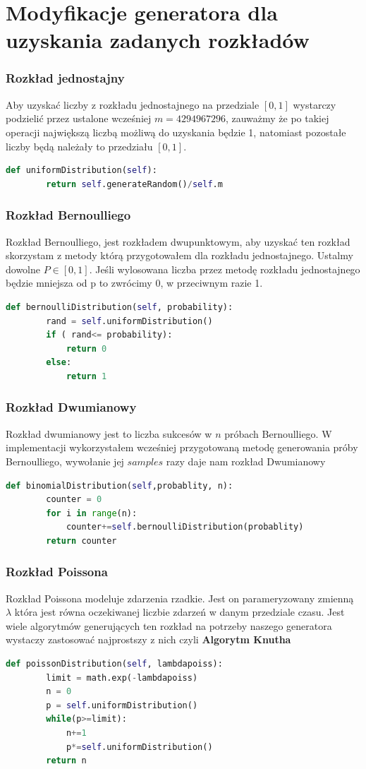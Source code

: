\documentclass[9pt]{beamer}
\begin{document}
\section{Modyfikacje generatora dla uzyskania zadanych rozkładów}
\begin{frame}[containsverbatim]
  \frametitle{Rozkład jednostajny}
  Aby uzyskać liczby z rozkładu jednostajnego na przedziale $[0,1]$ wystarczy podzielić przez ustalone wcześniej $m=4294967296$, zauważmy że po takiej operacji największą liczbą możliwą do uzyskania będzie 1, natomiast pozostałe liczby będą należały to przedziału $[0,1]$.
  \begin{lstlisting}[language=Python, caption=Metoda rozkładu jednostajnego]
    def uniformDistribution(self):
        return self.generateRandom()/self.m
    \end{lstlisting}
\end{frame}
\begin{frame}[containsverbatim]
  
  \frametitle{Rozkład Bernoulliego}
  Rozkład Bernoulliego, jest rozkładem dwupunktowym, aby uzyskać ten rozkład skorzystam z metody którą przygotowałem dla rozkładu jednostajnego. Ustalmy dowolne $P\in [0,1]$. Jeśli wylosowana liczba przez metodę rozkładu jednostajnego będzie mniejsza od p to zwrócimy 0, w przeciwnym razie 1.
  \begin{lstlisting}[language=Python, caption=Metoda rozkładu Bernoulliego]
    def bernoulliDistribution(self, probability):
        rand = self.uniformDistribution()
        if ( rand<= probability):
            return 0
        else:
            return 1
    \end{lstlisting}
\end{frame}
\begin{frame}[containsverbatim]
  \frametitle{Rozkład Dwumianowy}
  Rozkład dwumianowy jest to liczba sukcesów w $n$ próbach Bernoulliego. W implementacji wykorzystałem wcześniej przygotowaną metodę generowania próby Bernoulliego, wywołanie jej $samples$ razy daje nam rozkład Dwumianowy
  \begin{lstlisting}[language=Python, caption=Metoda rozkładu Dwumianowego]
    def binomialDistribution(self,probablity, n):
        counter = 0
        for i in range(n):
            counter+=self.bernoulliDistribution(probablity)
        return counter
    \end{lstlisting}
\end{frame}
\begin{frame}[containsverbatim]
  \frametitle{Rozkład Poissona}
  Rozkład Poissona modeluje zdarzenia rzadkie. Jest on parameryzowany zmienną $\lambda$ która jest równa oczekiwanej liczbie zdarzeń w danym przedziale czasu. Jest wiele algorytmów generujących ten rozkład na potrzeby naszego generatora wystaczy zastosować najprostszy z nich czyli \textbf{ Algorytm Knutha}
  \begin{lstlisting}[language=Python, caption=Metoda rozkładu Poissona]
    def poissonDistribution(self, lambdapoiss):
        limit = math.exp(-lambdapoiss)
        n = 0
        p = self.uniformDistribution()
        while(p>=limit):
            n+=1
            p*=self.uniformDistribution()
        return n
    \end{lstlisting}
\end{frame}
\end{document}
